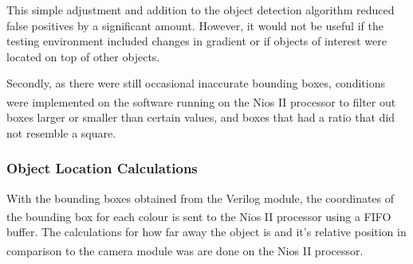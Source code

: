 \documentclass[a4paper]{article}
\begin{document}
This simple adjustment and addition to the object detection algorithm reduced false 
positives by a significant amount. However, it would not be useful if the testing
environment included changes in gradient or if objects of interest were located 
on top of other objects. 

Secondly, as there were still occasional inaccurate bounding boxes, conditions 
were implemented on the software running on the Nios\textsuperscript{\textregistered} II processor to filter out 
boxes larger or smaller than certain values, and boxes that had a ratio that did 
not resemble a square. 



\subsubsection{Object Location Calculations}

With the bounding boxes obtained from the Verilog module, the coordinates of the
bounding box for each colour is sent to the Nios\textsuperscript{\textregistered} II processor using a FIFO buffer.
The calculations for how far away the object is and it's relative position in 
comparison to the camera module was are done on the Nios\textsuperscript{\textregistered} II processor. 
\end{document}
